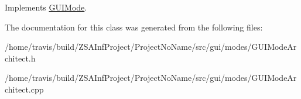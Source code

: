 Implements \hyperlink{classGUIMode_a7214583ea056553d7274cb3b8d8a1925}{G\-U\-I\-Mode}.



The documentation for this class was generated from the following files\-:\begin{DoxyCompactItemize}
\item 
/home/travis/build/\-Z\-S\-A\-Inf\-Project/\-Project\-No\-Name/src/gui/modes/G\-U\-I\-Mode\-Architect.\-h\item 
/home/travis/build/\-Z\-S\-A\-Inf\-Project/\-Project\-No\-Name/src/gui/modes/G\-U\-I\-Mode\-Architect.\-cpp\end{DoxyCompactItemize}
